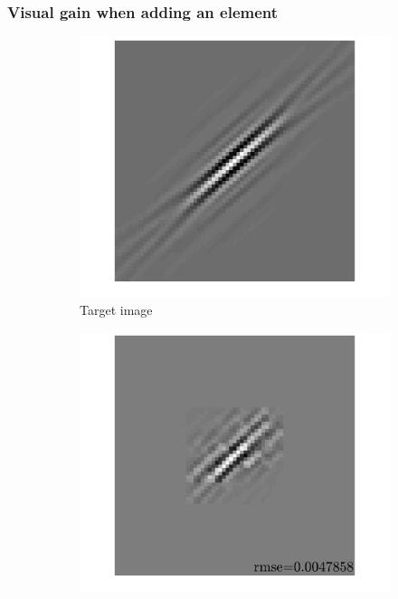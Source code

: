 \subsubsection{Visual gain when adding an element}

\begin{figure}[!ht]\centering
\begin{subfigure}[b]{0.32\linewidth}\centering
\includegraphics[width=\linewidth]{figures/before_after/xp_128x128_sc2_angl1_K3_S3_node4before_target.pdf}
	\caption{Target image}
\end{subfigure}
\begin{subfigure}[b]{0.32\linewidth}\centering
\includegraphics[width=\linewidth]{figures/before_after/xp_128x128_sc2_angl1_K3_S3_node4before_approx.pdf}

\end{subfigure}
\end{figure}
